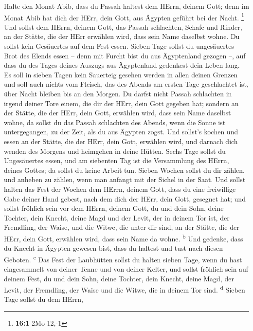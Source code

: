  Halte den Monat Abib, dass du Passah haltest dem HErrn,
deinem Gott; denn im Monat Abib hat dich der HErr, dein Gott, aus
Ägypten geführt bei der Nacht. \footnote{\textbf{16:1} 2Mo 12,-1}
 Und sollst dem HErrn, deinem Gott, das Passah schlachten,
Schafe und Rinder, an der Stätte, die der HErr erwählen wird, dass sein
Name daselbst wohne.  Du sollst kein Gesäuertes auf dem
Fest essen. Sieben Tage sollst du ungesäuertes Brot des Elends essen --
denn mit Furcht bist du aus Ägyptenland gezogen --, auf dass du des
Tages deines Auszugs aus Ägyptenland gedenkest dein Leben lang.
 Es soll in sieben Tagen kein Sauerteig gesehen werden in
allen deinen Grenzen und soll auch nichts vom Fleisch, das des Abends am
ersten Tage geschlachtet ist, über Nacht bleiben bis an den Morgen.
 Du darfst nicht Passah schlachten in irgend deiner Tore
einem, die dir der HErr, dein Gott gegeben hat;  sondern
an der Stätte, die der HErr, dein Gott, erwählen wird, dass sein Name
daselbst wohne, da sollst du das Passah schlachten des Abends, wenn die
Sonne ist untergegangen, zu der Zeit, als du aus Ägypten zogst.
 Und sollst's kochen und essen an der Stätte, die der
HErr, dein Gott, erwählen wird, und darnach dich wenden des Morgens und
heimgehen in deine Hütten.  Sechs Tage sollst du
Ungesäuertes essen, und am siebenten Tag ist die Versammlung des HErrn,
deines Gottes; da sollst du keine Arbeit tun.  Sieben
Wochen sollst du dir zählen, und anheben zu zählen, wenn man anfängt mit
der Sichel in der Saat.  Und sollst halten das Fest der
Wochen dem HErrn, deinem Gott, dass du eine freiwillige Gabe deiner Hand
gebest, nach dem dich der HErr, dein Gott, gesegnet hat; 
und sollst fröhlich sein vor dem HErrn, deinem Gott, du und dein Sohn,
deine Tochter, dein Knecht, deine Magd und der Levit, der in deinem Tor
ist, der Fremdling, der Waise, und die Witwe, die unter dir sind, an der
Stätte, die der HErr, dein Gott, erwählen wird, dass sein Name da wohne.
\textsuperscript{b}  Und gedenke, dass du Knecht in
Ägypten gewesen bist, dass du haltest und tust nach diesen Geboten.
\textsuperscript{c}  Das Fest der Laubhütten sollst du
halten sieben Tage, wenn du hast eingesammelt von deiner Tenne und von
deiner Kelter,  und sollst fröhlich sein auf deinem Fest,
du und dein Sohn, deine Tochter, dein Knecht, deine Magd, der Levit, der
Fremdling, der Waise und die Witwe, die in deinem Tor sind.
\textsuperscript{d}  Sieben Tage sollst du dem HErrn,
